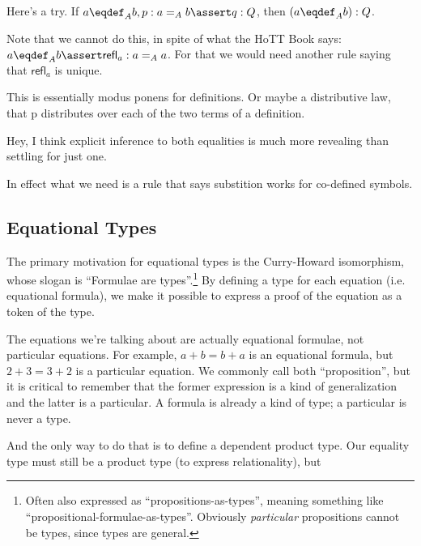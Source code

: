 \documentclass{article}
\begin{document}
Here's a try. If \(a\defeq_A b, p:a=_A b \linfer q:Q\), then \((a\defeq_A b):Q\).


Note that we cannot do this, in spite of what the HoTT Book says:
\mbox{\(a\defeq_A b\linfer\textsf{refl}_a:a=_A a\)}. For that we would
need another rule saying that \(\textsf{refl}_a\) is unique.

This is essentially modus ponens for definitions. Or maybe a
distributive law, that p distributes over each of the two terms of a
definition.

Hey, I think explicit inference to both equalities is much more
revealing than settling for just one.

In effect what we need is a rule that says substition works for
co-defined symbols.

\subsection{Equational Types}

The primary motivation for equational types is the Curry-Howard
isomorphism, whose slogan is ``Formulae are types''.\footnote{Often
also expressed as ``propositions-as-types'', meaning something like
``propositional-formulae-as-types''. Obviously \textit{particular}
propositions cannot be types, since types are general.} By defining a
type for each equation (i.e. equational formula), we make it possible
to express a proof of the equation as a token of the type.

The equations we're talking about are actually equational formulae,
not particular equations. For example, \(a+b=b+a\) is an equational
formula, but \(2+3=3+2\) is a particular equation. We commonly call
both ``proposition'', but it is critical to remember that the former
expression is a kind of generalization and the latter is a particular.
A formula is already a kind of type; a particular is never a type.


And the only way to do that is to define a dependent product type. Our
equality type must still be a product type (to express relationality),
but
\end{document}
